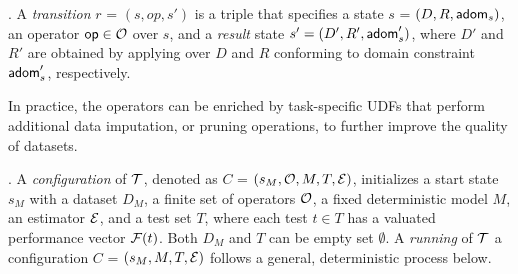 
. A {\em transition} $r$ = $(s,op, s')$ is a triple that 
specifies a state $s$ = $(D, R, {\mathsf{adom}}_s)$, an operator ${\mathsf{op}}\in {\mathcal O}$ over $s$, and a {\em result} state $s'= (D', R', {\mathsf{adom}}'_s)$, where 
$D'$ and $R'$ are obtained 
by applying \op over 
$D$ and $R$ conforming to 
domain constraint  ${\mathsf{adom}}'_s$, 
respectively. 

In practice, the operators 
can be enriched by task-specific UDFs 
that perform additional data imputation, 
or pruning operations, to further improve 
the quality of datasets. 


. A {\em configuration} of ${\mathcal T}$, 
denoted as $C$ = $(s_M, {\mathcal O}, M, T, {\mathcal E})$, initializes a start state $s_M$ with 
a dataset $D_M$, a finite set of operators ${\mathcal O}$,  
a fixed deterministic model $M$, an 
estimator ${\mathcal E}$, 
and a test set $T$, where each 
test $t\in T$ has a valuated performance vector ${\mathcal F}(t)$. 
Both $D_M$ and $T$ can be empty set $\emptyset$. 
A {\em running} 
of ${\mathcal T}$ \wrt a configuration $C$ = $(s_M, M, T, {\mathcal E})$ follows a general, deterministic process below.

